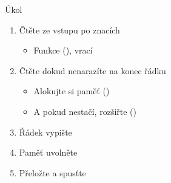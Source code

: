 \begin{frame}{Úkol}

  \begin{enumerate}
    \item Čtěte ze vstupu po znacích
    \begin{itemize}
      \item Funkce  (), vrací 
    \end{itemize}

    \item Čtěte dokud nenarazíte na konec řádku 
    \begin{itemize}
      \item Alokujte si paměť ()
      \item A pokud nestačí, rozšiřte ()
    \end{itemize}

    \item Řádek vypište
    \item Paměť uvolněte
    \item Přeložte a spusťte
  \end{enumerate}

\end{frame}


